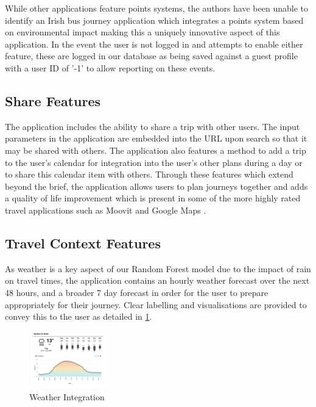 \documentclass[]{UCD_CS_47360_Report}
\begin{document}
While other applications feature points systems, the authors have been unable to identify an Irish bus journey application which integrates a points system based on environmental impact making this a uniquely innovative aspect of this application. In the event the user is not logged in and attempts to enable either feature, these are logged in our database as being saved against a guest profile with a user ID of '-1' to allow reporting on these events.

\subsection{Share Features}

The application includes the ability to share a trip with other users. The input parameters in the application are embedded into the URL upon search so that it may be shared with others. The application also features a method to add a trip to the user's calendar for integration into the user's other plans during a day or to share this calendar item with others. Through these features which extend beyond the brief, the application allows users to plan journeys together and adds a quality of life improvement which is present in some of the more highly rated travel applications such as Moovit \cite{Moovit-Review} and Google Maps \cite{GoogleMaps-Review}.

\subsection{Travel Context Features}
As weather is a key aspect of our Random Forest model due to the impact of rain on travel times, the application contains an hourly weather forecast over the next 48 hours, and a broader 7 day forecast in order for the user to prepare appropriately for their journey. Clear labelling and visualisations are provided to convey this to the user as detailed in \ref{fig:WeatherWidget}.
\begin{figure}[!htb]
    \centering
    \includegraphics[width=0.3\textwidth]{figures/2_5_WeatherWidget.png}
    \caption{Weather Integration}
    \label{fig:WeatherWidget}
\end{figure}
\end{document}
